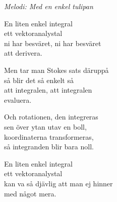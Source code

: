 {\footnotesize\textit{Melodi: Med en enkel tulipan}}\par
\vspace{10pt}
En liten enkel integral\\
ett vektoranalystal\\
ni har besväret, ni har besväret\\
att derivera.\par
\vspace{10pt}
Men tar man Stokes sats däruppå\\
så blir det så enkelt så\\
att integralen, att integralen\\
evaluera.\par
\vspace{10pt}
Och rotationen, den integreras\\
sen över ytan utav en boll,\\
koordinaterna transformeras,\\
så integranden blir bara noll.\par
\vspace{10pt}
En liten enkel integral\\
ett vektoranalystal\\
kan va så djävlig att man ej hinner\\
med något mera.
